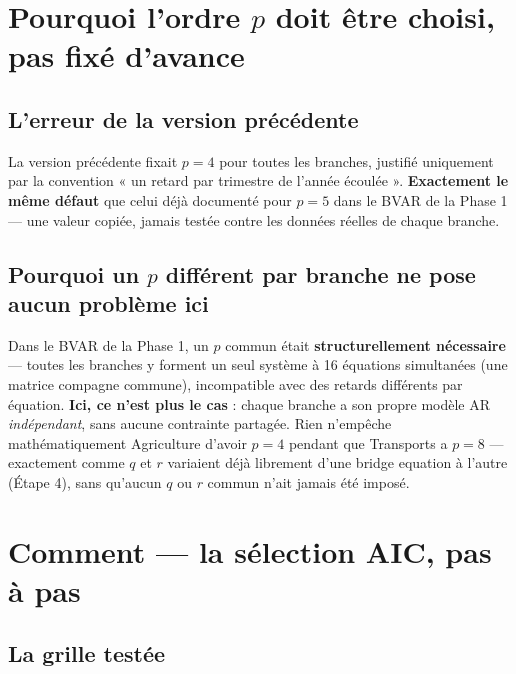 \documentclass[11pt,a4paper]{article}
\begin{document}
\section{Pourquoi l'ordre $p$ doit être choisi, pas fixé d'avance}

\subsection{L'erreur de la version précédente}

\begin{alertebox}
La version précédente fixait $p=4$ pour toutes les branches, justifié uniquement par la convention « un retard par trimestre de l'année écoulée ». \textbf{Exactement le même défaut} que celui déjà documenté pour $p=5$ dans le BVAR de la Phase 1 --- une valeur copiée, jamais testée contre les données réelles de chaque branche.
\end{alertebox}

\subsection{Pourquoi un $p$ différent par branche ne pose aucun problème ici}

\begin{intuition}
Dans le BVAR de la Phase 1, un $p$ commun était \textbf{structurellement nécessaire} --- toutes les branches y forment un seul système à 16 équations simultanées (une matrice compagne commune), incompatible avec des retards différents par équation. \textbf{Ici, ce n'est plus le cas} : chaque branche a son propre modèle AR \emph{indépendant}, sans aucune contrainte partagée. Rien n'empêche mathématiquement Agriculture d'avoir $p=4$ pendant que Transports a $p=8$ --- exactement comme $q$ et $r$ variaient déjà librement d'une bridge equation à l'autre (Étape 4), sans qu'aucun $q$ ou $r$ commun n'ait jamais été imposé.
\end{intuition}

\section{Comment --- la sélection AIC, pas à pas}

\subsection{La grille testée}
\end{document}
